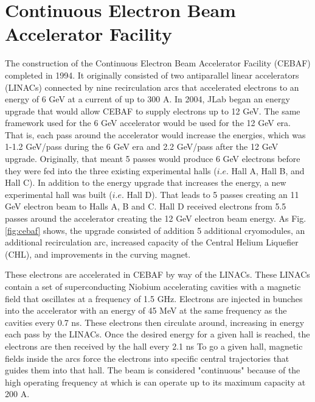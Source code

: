 \section{Continuous Electron Beam Accelerator Facility}
The construction of the Continuous Electron Beam Accelerator Facility (CEBAF) completed in 1994. It originally consisted of two antiparallel linear accelerators (LINACs) connected by nine recirculation arcs that accelerated electrons to an energy of 6 GeV at a current of up to 300 \textmu A. In 2004, JLab began an energy upgrade that would allow CEBAF to supply electrons up to 12 GeV. The same framework used for the 6 GeV accelerator would be used for the 12 GeV era. That is, each pass around the accelerator would increase the energies, which was 1-1.2 GeV/pass during the 6 GeV era and 2.2 GeV/pass after the 12 GeV upgrade. Originally, that meant 5 passes would produce 6 GeV electrons before they were fed into the three existing experimental halls ($i.e.$ Hall A, Hall B, and Hall C). In addition to the energy upgrade that increases the energy, a new experimental hall was built ($i.e.$ Hall D). That leads to 5 passes creating an 11 GeV electron beam to Halls A, B and C. Hall D received electrons from 5.5 passes around the accelerator creating the 12 GeV electron beam energy. As Fig. \ref{fig:cebaf} shows, the upgrade consisted of addition 5 additional cryomodules, an additional recirculation arc, increased capacity of the Central Helium Liquefier (CHL), and improvements in the curving magnet.

These electrons are accelerated in CEBAF by way of the LINACs. These LINACs contain a set of superconducting Niobium accelerating cavities with a magnetic field that oscillates at a frequency of 1.5 GHz. Electrons are injected in bunches into the accelerator with an energy of 45 MeV at the same frequency as the cavities every 0.7 ns. These electrons then circulate around, increasing in energy each pass by the LINACs. Once the desired energy for a given hall is reached, the electrons are then received by the hall every 2.1 ns To go a given hall, magnetic fields inside the arcs force the electrons into specific central trajectories that guides them into that hall. The beam is considered "continuous" because of the high operating frequency at which is can operate up to its maximum capacity at 200 \textmu A.
 
